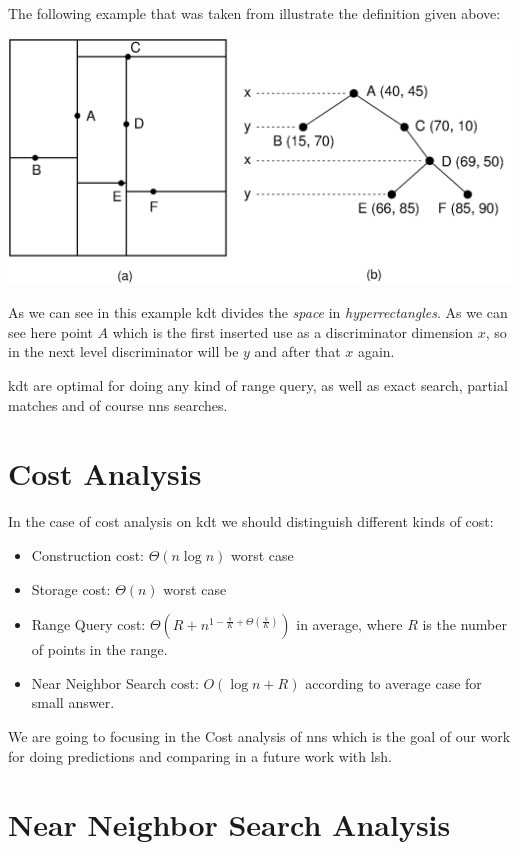 \documentclass[12pt, a4paper]{article}
\begin{document}
The following example that was taken from \cite{vtech_page} illustrate the definition given above:

\begin{minipage}[t]{\linewidth}
  \includegraphics[width=\textwidth]{KDTree}
  \label{fig:kdtree_example}
\end{minipage}

As we can see in this example \acrshort{kdt} divides the \textit{space} in \textit{hyperrectangles}. As we can see here point $A$ which is the first inserted use as a discriminator dimension $x$, so in the next level discriminator will be $y$ and after that $x$ again.

\acrshort{kdt} are optimal for doing any kind of range query, as well as exact search, partial matches and of course \acrshort{nns} searches.

\section{Cost Analysis}
In the case of cost analysis on \acrshort{kdt} we should distinguish different kinds of cost:

\begin{itemize}
  \item Construction cost: $\Theta(n\log{n})$ worst case
  \item Storage cost: $\Theta(n)$ worst case
  \item Range Query cost: $\Theta(R + n^{1 - \frac{s}{K} + \Theta(\frac{s}{K})})$ in average, where $R$ is the number of points in the range.
  \item Near Neighbor Search cost: $O(\log{n} + R)$ according to \cite{fried} average case for small answer.
\end{itemize}

We are going to focusing in the Cost analysis of \acrshort{nns} which is the goal of our work for doing predictions and comparing in a future work with \acrshort{lsh}.


\section{Near Neighbor Search Analysis}







\printglossaries
\end{document}
